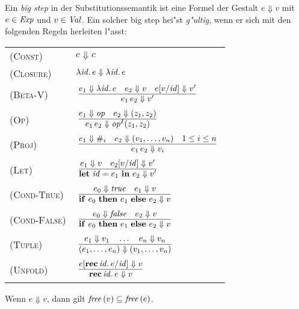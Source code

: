 \documentclass[12pt,fleqn,a4paper]{article}
\newcommand{\RN}[1]{\mbox{\textsc{(#1)}}}
\begin{document}
\begin{definition}
Ein {\em big step} in der Substitutionssemantik ist eine Formel der Gestalt $e \Downarrow v$ mit $e\in{\text{\it Exp\/}}$
und $v \in {\text{\it Val\/}}$. Ein solcher big step hei"st {\em g"ultig}, wenn er sich mit den folgenden Regeln herleiten
l"asst: \\[5mm]
\begin{tabular}{ll}
  \RN{Const}      & $c \Downarrow c$ \\[1mm]
  \RN{Closure}    & $\lambda {\text{\it id\/}}.\,e \Downarrow \lambda {\text{\it id\/}}.\,e$ \\[1mm]
  \RN{Beta-V}     & $\regel{e_1 \Downarrow \abstr{\id}{e} \quad e_2 \Downarrow v \quad e[v/\id] \Downarrow v'}
                           {\app{e_1}{e_2} \Downarrow v'}$ \\[3mm]
  \RN{Op}         & $\regel{e_1 \Downarrow \op \quad e_2 \Downarrow (z_1,z_2)}
                           {\app{e_1}{e_2} \Downarrow \op^I(z_1,z_2)}$ \\[3mm]
  \RN{Proj}       & $\regel{e_1 \Downarrow \proj{i} \quad e_2 \Downarrow (v_1,\ldots,v_n) \quad 1 \le i \le n}
                           {\app{e_1}{e_2} \Downarrow v_i}$ \\[3mm]
  \RN{Let}        & $\regel{e_1 \Downarrow v \quad e_2[v/\id] \Downarrow v'}
                           {\bli{\id}{e_1}{e_2} \Downarrow v'}$ \\[3mm]
  \RN{Cond-True}  & $\regel{e_0 \Downarrow \true \quad e_1 \Downarrow v}
                           {\bifte{e_0}{e_1}{e_2} \Downarrow v}$ \\[3mm]
  \RN{Cond-False} & $\regel{e_0 \Downarrow \false \quad e_2 \Downarrow v}
                           {\bifte{e_0}{e_1}{e_2} \Downarrow v}$ \\[3mm]
  \RN{Tuple}      & $\regel{e_1 \Downarrow v_1 \quad \ldots \quad e_n \Downarrow v_n}
                           {(e_1,\ldots,e_n) \Downarrow (v_1,\ldots,v_n)}$ \\[3mm]
  \RN{Unfold}     & $\regel{e[\rec{\id}{e}/\id] \Downarrow v}
                           {\rec{\id}{e} \Downarrow v}$ \\[3mm]
\end{tabular}
\end{definition}

\begin{lemma} \label{lemma:WD_Substs}
  Wenn $e \Downarrow v$, dann gilt ${\text{\it free\/}}\,(v) \subseteq {\text{\it free\/}}\,(e)$.
\end{lemma}
\end{document}
